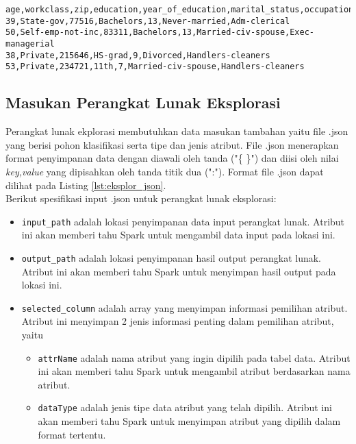 \begin{lstlisting}[basicstyle=\ttfamily, frame=single,
	columns=fullflexible, keepspaces=true, breaklines=true, label=lst:pl_csv, caption=Dataset Adult]
age,workclass,zip,education,year_of_education,marital_status,occupation
39,State-gov,77516,Bachelors,13,Never-married,Adm-clerical
50,Self-emp-not-inc,83311,Bachelors,13,Married-civ-spouse,Exec-managerial
38,Private,215646,HS-grad,9,Divorced,Handlers-cleaners
53,Private,234721,11th,7,Married-civ-spouse,Handlers-cleaners
\end{lstlisting}

\subsection{Masukan Perangkat Lunak Eksplorasi}
Perangkat lunak ekplorasi membutuhkan data masukan tambahan yaitu file .json yang berisi pohon klasifikasi serta tipe dan jenis atribut. File .json menerapkan format penyimpanan data dengan diawali oleh tanda ("\{ \}") dan diisi oleh nilai \textit{key,value} yang dipisahkan oleh tanda titik dua (":"). Format file .json dapat dilihat pada Listing \ref{lst:eksplor_json}.\\

\noindent Berikut spesifikasi input .json untuk perangkat lunak eksplorasi:

\begin{itemize}

\item \texttt{input\_path} adalah lokasi penyimpanan data input perangkat lunak. Atribut ini akan memberi tahu Spark untuk mengambil data input pada lokasi ini.

\item \texttt{output\_path} adalah lokasi penyimpanan hasil output perangkat lunak. Atribut ini akan memberi tahu Spark untuk menyimpan hasil output pada lokasi ini.

\item \texttt{selected\_column} adalah array yang menyimpan informasi pemilihan atribut. Atribut ini menyimpan 2 jenis informasi penting dalam pemilihan atribut, yaitu

\begin{itemize}

\item \texttt{attrName} adalah nama atribut yang ingin dipilih pada tabel data. Atribut ini akan memberi tahu Spark untuk mengambil atribut berdasarkan nama atribut.

\item \texttt{dataType} adalah jenis tipe data atribut yang telah dipilih. Atribut ini akan memberi tahu Spark untuk menyimpan atribut yang dipilih dalam format tertentu.

\end{itemize}

\end{itemize}

